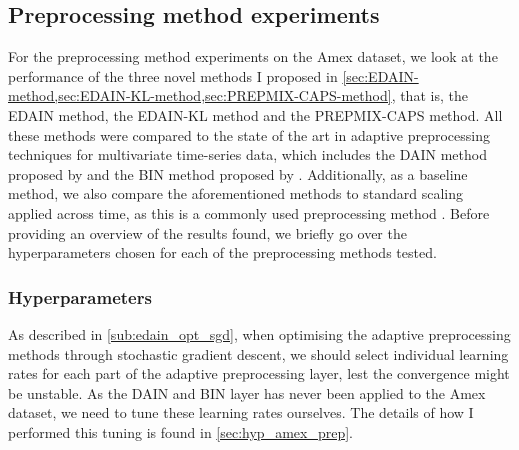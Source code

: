 \documentclass{statsmsc}
\begin{document}
{%

\subsection{Preprocessing method experiments}%
\label{sub:amex_res}

For the preprocessing method experiments on the Amex dataset, we look at the performance of
the three novel methods I proposed in \cref{sec:EDAIN-method,sec:EDAIN-KL-method,sec:PREPMIX-CAPS-method}, that is, the \ac{EDAIN} method, the \ac{EDAIN-KL} method and the \ac{PREPMIX-CAPS} method.
All these methods were compared to the state of the art in adaptive preprocessing techniques
for multivariate time-series data, which includes the \ac{DAIN} method proposed
by \cite{dain} and the
\ac{BIN} method proposed by \cite{bin}. Additionally, as a baseline method, we also compare the
aforementioned methods to standard scaling applied across time, as this is a commonly used
preprocessing method \citep{singh,nawi,stanislav}.
Before providing an overview of the results found, we briefly go over the
hyperparameters chosen for each of the preprocessing methods tested.

\subsubsection{Hyperparameters}%
\label{ssub:Learning rate tuning}

As described in \cref{sub:edain_opt_sgd}, when optimising the adaptive preprocessing methods
through stochastic gradient descent, we should select individual learning rates for each part
of the adaptive preprocessing layer, lest the convergence might be unstable.
As the \ac{DAIN} and \ac{BIN} layer has never been applied to the Amex dataset, we need
to tune these learning rates ourselves. The details of how I performed this tuning is found in
\cref{sec:hyp_amex_prep}.

}
\end{document}
